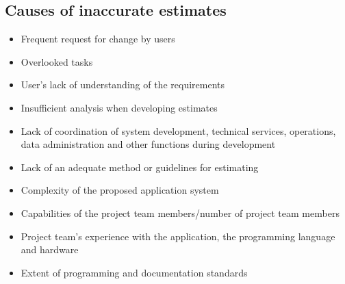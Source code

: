 \documentclass{article}[18pt]
\begin{document}
\subsection{Causes of inaccurate estimates}
\begin{itemize}
	\item Frequent request for change by users
	\item Overlooked tasks
	\item User's lack of understanding of the requirements
	\item Insufficient analysis when developing estimates
	\item Lack of coordination of system development, technical services, operations, data administration and other functions during development
	\item Lack of an adequate method or guidelines for estimating
	\item Complexity of the proposed application system
	\item Capabilities of the project team members/number of project team members
	\item Project team's experience with the application, the programming language and hardware
	\item Extent of programming and documentation standards
\end{itemize}
\end{document}
